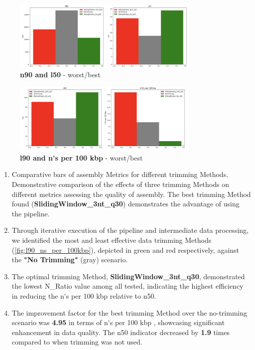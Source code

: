 \begin{figure}[!ht]
    \centering
    \includegraphics[width=0.8\textwidth]{resources/images/n90_l50.png}
    \caption{\textbf{\gls{n90} and \gls{l50}} - worst/best}
    \label{fig:n90_l50}
\end{figure}

\begin{figure}[!ht]
    \centering
    \includegraphics[width=0.8\textwidth]{resources/images/l90_ns_per_100kbp.png}
    \caption{\textbf{\gls{l90} and \gls{n's per 100 kbp}} - worst/best}
    \label{fig:l90_ns_per_100kbp}
\end{figure}


\begin{enumerate}
    \item{Comparative \gls{bar}s of \gls{assembly} Metrics for different \gls{trimming} Methods. Demonstrative comparison of the effects of three \gls{trimming} Methods on different metrics assessing the quality of \gls{assembly}. The best \gls{trimming} Method found (\textbf{SlidingWindow\_3nt\_q30}) demonstrates the advantage of using the pipeline.}
    \item Through iterative execution of the pipeline and intermediate data processing, we identified the most and least effective data \gls{trimming} Methods (\autoref{fig:l90_ns_per_100kbp}), depicted in green and red respectively, against the \textbf{"No Trimming"} (gray) scenario.
    \item The optimal \gls{trimming}  Method, \textbf{SlidingWindow\_3nt\_q30}, demonstrated the lowest N\_Ratio value among all tested, indicating the highest efficiency in reducing the \gls{n's per 100 kbp}  relative to \gls{n50}.
    \item The improvement factor for the best \gls{trimming} Method over the no-trimming scenario was \textbf{4.95} in terms of \gls{n's per 100 kbp} , showcasing significant enhancement in data quality. The \gls{n50}  indicator decreased by \textbf{1.9} times compared to when \gls{trimming}  was not used.
\end{enumerate}